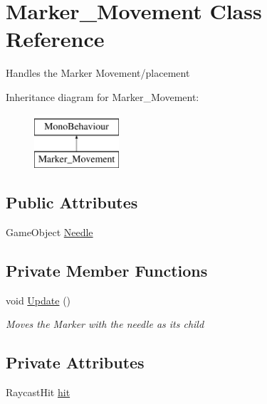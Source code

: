\hypertarget{class_marker___movement}{}\section{Marker\+\_\+\+Movement Class Reference}
\label{class_marker___movement}


Handles the Marker Movement/placement  


Inheritance diagram for Marker\+\_\+\+Movement\+:\begin{figure}[H]
\begin{center}
\leavevmode
\includegraphics[height=2.000000cm]{class_marker___movement}
\end{center}
\end{figure}
\subsection*{Public Attributes}
\begin{DoxyCompactItemize}
\item 
Game\+Object \mbox{\hyperlink{class_marker___movement_a88ad1d16dbb171a7e966883318548172}{Needle}}
\end{DoxyCompactItemize}
\subsection*{Private Member Functions}
\begin{DoxyCompactItemize}
\item 
void \mbox{\hyperlink{class_marker___movement_a8d9253cbb8a41a9c9cba53d30fc57e05}{Update}} ()
\begin{DoxyCompactList}\small\item\em Moves the Marker with the needle as its child \end{DoxyCompactList}\end{DoxyCompactItemize}
\subsection*{Private Attributes}
\begin{DoxyCompactItemize}
\item 
Raycast\+Hit \mbox{\hyperlink{class_marker___movement_a3f87c054d005f16443d87c58e863b8b2}{hit}}
\end{DoxyCompactItemize}


